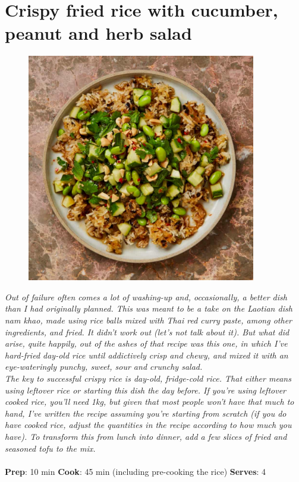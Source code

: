 \documentclass{book}
\begin{document}
\section{Crispy fried rice with cucumber, peanut and herb salad}
\begin{figure}
\centering\includegraphics[width=10cm,height=10cm,keepaspectratio]{Recipe_Pictures/Crispy_fried_rice_with_cucumber,_peanut_and_herb_salad.png}
\end{figure}
\emph{Out of failure often comes a lot of washing-up and, occasionally, a better dish than I had originally planned. This was meant to be a take on the Laotian dish nam khao, made using rice balls mixed with Thai red curry paste, among other ingredients, and fried. It didn’t work out (let’s not talk about it). But what did arise, quite happily, out of the ashes of that recipe was this one, in which I’ve hard-fried day-old rice until addictively crisp and chewy, and mixed it with an eye-wateringly punchy, sweet, sour and crunchy salad.\\ 
The key to successful crispy rice is day-old, fridge-cold rice. That either means using leftover rice or starting this dish the day before. If you’re using leftover cooked rice, you’ll need 1kg, but given that most people won’t have that much to hand, I’ve written the recipe assuming you’re starting from scratch (if you do have cooked rice, adjust the quantities in the recipe according to how much you have). To transform this from lunch into dinner, add a few slices of fried and seasoned tofu to the mix.}\\\\ 
\textbf{Prep}: 10 min
\textbf{Cook}: 45 min (including pre-cooking the rice)
\textbf{Serves}: 4
\end{document}
